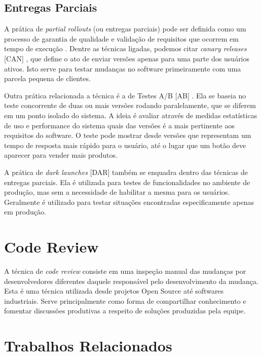 \subsection{Entregas Parciais}

A prática de \emph{partial rollouts} (ou entregas parciais) pode ser definida como um processo de garantia de qualidade e validação de requisitos que ocorrem em tempo de execução \cite{empiricalStudy2016}. Dentre as técnicas ligadas, podemos citar \emph{canary releases} [CAN] \cite{continuousDeliveryBook}, que define o ato de enviar versões apenas para uma parte dos usuários ativos. Isto serve para testar mudanças no software primeiramente com uma parcela pequena de clientes.

Outra prática relacionada a técnica é a de Testes A/B [AB] \cite{testsAB}. Ela se baseia no teste concorrente de duas ou mais versões rodando paralelamente, que se diferem em um ponto isolado do sistema. A ideia é avaliar através de medidas estatísticas de uso e performance do sistema quais das versões é a mais pertinente aos requisitos do software. O teste pode mostrar desde versões que representam um tempo de resposta mais rápido para o usuário, até o lugar que um botão deve aparecer para vender mais produtos.

A prática de \emph{dark launches} [DAR] \cite{devAndDeploymentFB} também se enquadra dentro das técnicas de entregas parciais. Ela é utilizada para testes de funcionalidades no ambiente de produção, mas sem a necessidade de habilitar a mesma para os usuários. Geralmente é utilizado para testar situações encontradas especificamente apenas em produção.  


\section{Code Review}

A técnica de \emph{code review} \cite{codeReview} consiste em uma inspeção manual das mudanças por desenvolvedores diferentes daquele responsável pelo desenvolvimento da mudança. Esta é uma técnica utilizada desde projetos Open Source até softwares industriais. Serve principalmente como forma de compartilhar conhecimento e fomentar discussões produtivas a respeito de soluções produzidas pela equipe.

\section{Trabalhos Relacionados}

